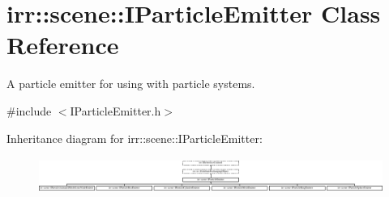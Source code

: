 \hypertarget{classirr_1_1scene_1_1IParticleEmitter}{}\section{irr\+:\+:scene\+:\+:I\+Particle\+Emitter Class Reference}
\label{classirr_1_1scene_1_1IParticleEmitter}


A particle emitter for using with particle systems.  




{\ttfamily \#include $<$I\+Particle\+Emitter.\+h$>$}

Inheritance diagram for irr\+:\+:scene\+:\+:I\+Particle\+Emitter\+:\begin{figure}[H]
\begin{center}
\leavevmode
\includegraphics[height=1.196581cm]{classirr_1_1scene_1_1IParticleEmitter}
\end{center}
\end{figure}
